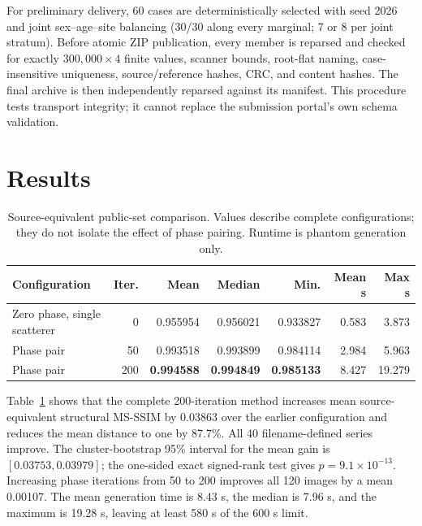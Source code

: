 \documentclass[runningheads]{llncs}
\newcommand{\ms}{MS-SSIM}
\begin{document}
For preliminary delivery, 60 cases are deterministically selected with seed
2026 and joint sex--age--site balancing (30/30 along every marginal; 7 or 8 per
joint stratum). Before atomic ZIP publication, every member is reparsed and
checked for exactly $300{,}000\!\times\!4$ finite values, scanner bounds,
root-flat naming, case-insensitive uniqueness, source/reference hashes, CRC,
and content hashes. The final archive is then independently reparsed against
its manifest. This procedure tests transport integrity; it cannot replace the
submission portal's own schema validation.

\section{Results}

\begin{table}[t]
\caption{Source-equivalent public-set comparison. Values describe complete
configurations; they do not isolate the effect of phase pairing. Runtime is
phantom generation only.}
\label{tab:local}
\centering
\small
\begin{tabular}{lrrrrrr}
\toprule
Configuration & Iter. & Mean & Median & Min. & Mean s & Max s\\
\midrule
Zero phase, single scatterer & 0 & 0.955954 & 0.956021 & 0.933827 & 0.583 & 3.873\\
Phase pair & 50 & 0.993518 & 0.993899 & 0.984114 & 2.984 & 5.963\\
Phase pair & 200 & \textbf{0.994588} & \textbf{0.994849} & \textbf{0.985133} & 8.427 & 19.279\\
\bottomrule
\end{tabular}
\end{table}

Table~\ref{tab:local} shows that the complete 200-iteration method increases
mean source-equivalent structural \ms{} by 0.03863 over the earlier
configuration and reduces the mean distance to one by 87.7\%. All 40
filename-defined series improve. The cluster-bootstrap 95\% interval for the
mean gain is $[0.03753,0.03979]$; the one-sided exact signed-rank test gives
$p=9.1\times10^{-13}$. Increasing phase iterations from 50 to 200 improves all
120 images by a mean 0.00107. The mean generation time is 8.43 s, the median is
7.96 s, and the maximum is 19.28 s, leaving at least 580 s of the 600 s limit.
\end{document}
